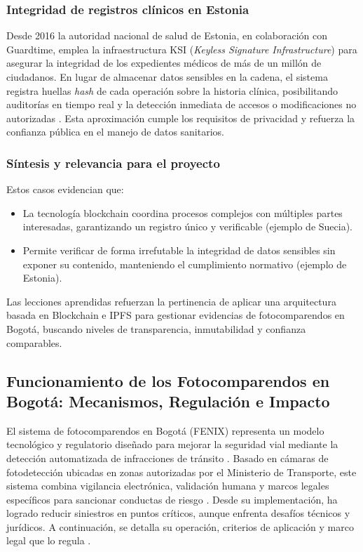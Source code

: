 \subsubsection{Integridad de registros clínicos en Estonia}

Desde 2016 la autoridad nacional de salud de Estonia, en colaboración con Guardtime, emplea la infraestructura KSI (\textit{Keyless Signature Infrastructure}) para asegurar la integridad de los expedientes médicos de más de un millón de ciudadanos. En lugar de almacenar datos sensibles en la cadena, el sistema registra huellas \textit{hash} de cada operación sobre la historia clínica, posibilitando auditorías en tiempo real y la detección inmediata de accesos o modificaciones no autorizadas \parencite{guardtime2016,reddit_estonia_blockchain}. Esta aproximación cumple los requisitos de privacidad y refuerza la confianza pública en el manejo de datos sanitarios.

\subsubsection{Síntesis y relevancia para el proyecto}

Estos casos evidencian que:
\begin{itemize}
  \item La tecnología blockchain coordina procesos complejos con múltiples partes interesadas, garantizando un registro único y verificable (ejemplo de Suecia).
  \item Permite verificar de forma irrefutable la integridad de datos sensibles sin exponer su contenido, manteniendo el cumplimiento normativo (ejemplo de Estonia).
\end{itemize}

Las lecciones aprendidas refuerzan la pertinencia de aplicar una arquitectura basada en Blockchain e IPFS para gestionar evidencias de fotocomparendos en Bogotá, buscando niveles de transparencia, inmutabilidad y confianza comparables.


\subsection{Funcionamiento de los Fotocomparendos en Bogotá: Mecanismos, Regulación e Impacto} 
El sistema de fotocomparendos en Bogotá (FENIX) representa un modelo tecnológico y regulatorio diseñado para mejorar la seguridad vial mediante la detección automatizada de infracciones de tránsito \parencite{mintransporte2023}. Basado en cámaras de fotodetección ubicadas en zonas autorizadas por el Ministerio de Transporte, este sistema combina vigilancia electrónica, validación humana y marcos legales específicos para sancionar conductas de riesgo \parencite{supertransporte2021}. Desde su implementación, ha logrado reducir siniestros en puntos críticos, aunque enfrenta desafíos técnicos y jurídicos. A continuación, se detalla su operación, criterios de aplicación y marco legal que lo regula \parencite{mintransporte2023}.

